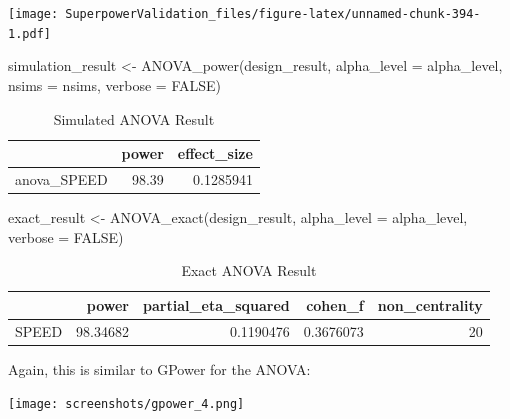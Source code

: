 \documentclass[
]{book}
\newenvironment{Shaded}{\begin{snugshade}}{\end{snugshade}}
\newcommand{\AttributeTok}[1]{\textcolor[rgb]{0.77,0.63,0.00}{#1}}
\newcommand{\ConstantTok}[1]{\textcolor[rgb]{0.00,0.00,0.00}{#1}}
\newcommand{\FunctionTok}[1]{\textcolor[rgb]{0.00,0.00,0.00}{#1}}
\newcommand{\NormalTok}[1]{#1}
\newcommand{\OtherTok}[1]{\textcolor[rgb]{0.56,0.35,0.01}{#1}}
\begin{document}
\texttt{[image: SuperpowerValidation\_files/figure-latex/unnamed-chunk-394-1.pdf]}

\begin{Shaded}
\begin{Highlighting}[]
\NormalTok{simulation\_result }\OtherTok{\textless{}{-}} \FunctionTok{ANOVA\_power}\NormalTok{(design\_result, }
                                 \AttributeTok{alpha\_level =}\NormalTok{ alpha\_level, }
                                 \AttributeTok{nsims =}\NormalTok{ nsims,}
                                 \AttributeTok{verbose =} \ConstantTok{FALSE}\NormalTok{)}
\end{Highlighting}
\end{Shaded}

\begin{table}[!h]

\caption{\label{tab:unnamed-chunk-396}Simulated ANOVA Result}
\centering
\begin{tabular}[t]{l|r|r}
\hline
  & power & effect\_size\\
\hline
anova\_SPEED & 98.39 & 0.1285941\\
\hline
\end{tabular}
\end{table}

\begin{Shaded}
\begin{Highlighting}[]
\NormalTok{exact\_result }\OtherTok{\textless{}{-}} \FunctionTok{ANOVA\_exact}\NormalTok{(design\_result,}
                            \AttributeTok{alpha\_level =}\NormalTok{ alpha\_level,}
                            \AttributeTok{verbose =} \ConstantTok{FALSE}\NormalTok{)}
\end{Highlighting}
\end{Shaded}

\begin{table}[!h]

\caption{\label{tab:unnamed-chunk-398}Exact ANOVA Result}
\centering
\begin{tabular}[t]{l|r|r|r|r}
\hline
  & power & partial\_eta\_squared & cohen\_f & non\_centrality\\
\hline
SPEED & 98.34682 & 0.1190476 & 0.3676073 & 20\\
\hline
\end{tabular}
\end{table}

Again, this is similar to GPower for the ANOVA:

\texttt{[image: screenshots/gpower\_4.png]}

  
\end{document}
